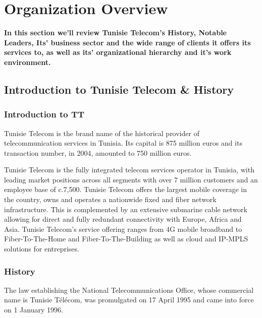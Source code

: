 \chapter{Organization Overview} %
\label{chap:org}
\textbf{In this section we'll review Tunisie Telecom's History, Notable Leaders, Its' business sector and the wide range of clients it offers its services to, as well as its' organizational hierarchy and it's work environment.}
\section{Introduction to Tunisie Telecom \& History} %

{}%
\subsection{Introduction to TT}%
Tunisie Telecom is the brand name of the historical provider of telecommunication services in Tunisia. Its capital is 875 million euros and its transaction number, in 2004, amounted to 750 million euros.

Tunisie Telecom is the fully integrated telecom services operator in Tunisia, with leading market positions across all segments with over 7 million customers and an employee base of c.7,500. Tunisie Telecom offers the largest mobile coverage in the country, owns and operates a nationwide fixed and fiber network infrastructure. This is complemented by an extensive submarine cable network allowing for direct and fully redundant connectivity with Europe, Africa and Asia. Tunisie Telecom’s service offering ranges from 4G mobile broadband to Fiber-To-The-Home and Fiber-To-The-Building as well as cloud and IP-MPLS solutions for entreprises.

\subsection{History} %
The law establishing the National Telecommunications Office, whose commercial name is Tunisie Télécom, was promulgated on 17 April 1995 and came into force on 1 January 1996.

